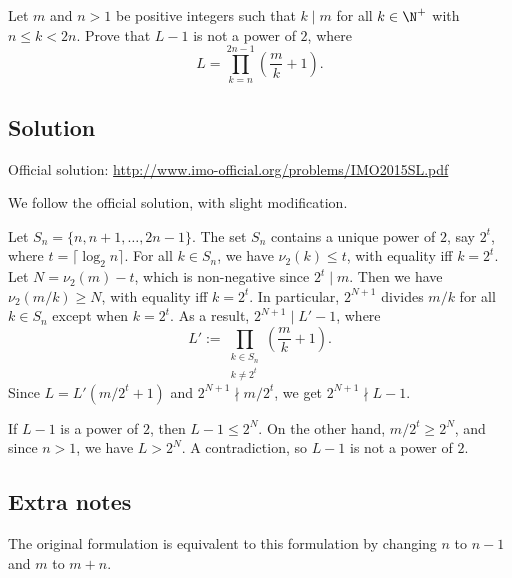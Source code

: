 Let $m$ and $n > 1$ be positive integers such that $k \mid m$ for all $k \in \N^+$ with $n \leq k < 2n$.
Prove that $L - 1$ is not a power of $2$, where
\[ L = \prod_{k = n}^{2n - 1} \left(\frac{m}{k} + 1\right). \]



\subsection*{Solution}

Official solution: \url{http://www.imo-official.org/problems/IMO2015SL.pdf}

We follow the official solution, with slight modification.

Let $S_n = \{n, n + 1, \ldots, 2n - 1\}$.
The set $S_n$ contains a unique power of $2$, say $2^t$, where $t = \lceil \log_2 n \rceil$.
For all $k \in S_n$, we have $\nu_2(k) \leq t$, with equality iff $k = 2^t$.
Let $N = \nu_2(m) - t$, which is non-negative since $2^t \mid m$.
Then we have $\nu_2(m/k) \geq N$, with equality iff $k = 2^t$.
In particular, $2^{N + 1}$ divides $m/k$ for all $k \in S_n$ except when $k = 2^t$.
As a result, $2^{N + 1} \mid L' - 1$, where
\[ L' := \prod_{\substack{k \in S_n \\ k \neq 2^t}} \left(\frac{m}{k} + 1\right). \]
Since $L = L' (m/2^t + 1)$ and $2^{N + 1} \nmid m/2^t$, we get $2^{N + 1} \nmid L - 1$.

If $L - 1$ is a power of $2$, then $L - 1 \leq 2^N$.
On the other hand, $m/2^t \geq 2^N$, and since $n > 1$, we have $L > 2^N$.
A contradiction, so $L - 1$ is not a power of $2$.



\subsection*{Extra notes}

The original formulation is equivalent to this formulation by changing $n$ to $n - 1$ and $m$ to $m + n$.

